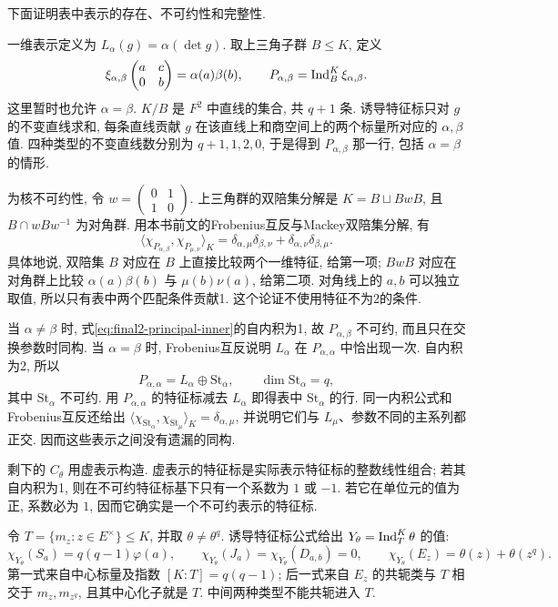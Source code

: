 \begin{solution}
下面证明表中表示的存在、不可约性和完整性.

一维表示定义为 $L_\alpha(g)=\alpha(\det g)$. 取上三角子群 $B\le K$, 定义
\[
 \xi_{\alpha,\beta}\begin{pmatrix}a&c\\0&b\end{pmatrix}=\alpha(a)\beta(b),\qquad
 P_{\alpha,\beta}=\operatorname{Ind}_B^K\xi_{\alpha,\beta}.
\]
这里暂时也允许 $\alpha=\beta$. $K/B$ 是 $F^2$ 中直线的集合, 共 $q+1$ 条. 诱导特征标只对 $g$ 的不变直线求和, 每条直线贡献 $g$ 在该直线上和商空间上的两个标量所对应的 $\alpha,\beta$ 值. 四种类型的不变直线数分别为 $q+1,1,2,0$, 于是得到 $P_{\alpha,\beta}$ 那一行, 包括 $\alpha=\beta$ 的情形.

为核不可约性, 令 $w=\left(\begin{smallmatrix}0&1\\1&0\end{smallmatrix}\right)$. 上三角群的双陪集分解是 $K=B\sqcup BwB$, 且 $B\cap wBw^{-1}$ 为对角群. 用本书前文的Frobenius互反与Mackey双陪集分解, 有
\begin{equation}\label{eq:final2-principal-inner}
 \langle\chi_{P_{\alpha,\beta}},\chi_{P_{\mu,\nu}}\rangle_K
 =\delta_{\alpha,\mu}\delta_{\beta,\nu}
  +\delta_{\alpha,\nu}\delta_{\beta,\mu}.
\end{equation}
具体地说, 双陪集 $B$ 对应在 $B$ 上直接比较两个一维特征, 给第一项; $BwB$ 对应在对角群上比较 $\alpha(a)\beta(b)$ 与 $\mu(b)\nu(a)$, 给第二项. 对角线上的 $a,b$ 可以独立取值, 所以只有表中两个匹配条件贡献1. 这个论证不使用特征不为2的条件.

当 $\alpha\ne\beta$ 时, 式\eqref{eq:final2-principal-inner}的自内积为1, 故 $P_{\alpha,\beta}$ 不可约, 而且只在交换参数时同构. 当 $\alpha=\beta$ 时, Frobenius互反说明 $L_\alpha$ 在 $P_{\alpha,\alpha}$ 中恰出现一次. 自内积为2, 所以
\[
 P_{\alpha,\alpha}=L_\alpha\oplus\mathrm{St}_\alpha,
 \qquad \dim\mathrm{St}_\alpha=q,
\]
其中 $\mathrm{St}_\alpha$ 不可约. 用 $P_{\alpha,\alpha}$ 的特征标减去 $L_\alpha$ 即得表中 $\mathrm{St}_\alpha$ 的行. 同一内积公式和Frobenius互反还给出
$\langle\chi_{\mathrm{St}_\alpha},\chi_{\mathrm{St}_\mu}\rangle_K=\delta_{\alpha,\mu}$, 并说明它们与 $L_\mu$、参数不同的主系列都正交. 因而这些表示之间没有遗漏的同构.

剩下的 $C_\theta$ 用虚表示构造. 虚表示的特征标是实际表示特征标的整数线性组合; 若其自内积为1, 则在不可约特征标基下只有一个系数为 $1$ 或 $-1$. 若它在单位元的值为正, 系数必为 $1$, 因而它确实是一个不可约表示的特征标.

令 $T=\{m_z:z\in E^\times\}\le K$, 并取 $\theta\ne\theta^q$. 诱导特征标公式给出 $Y_\theta=\operatorname{Ind}_T^K\theta$ 的值:
\[
 \chi_{Y_\theta}(S_a)=q(q-1)\varphi(a),\qquad
 \chi_{Y_\theta}(J_a)=\chi_{Y_\theta}(D_{a,b})=0,\qquad
 \chi_{Y_\theta}(E_z)=\theta(z)+\theta(z^q).
\]
第一式来自中心标量及指数 $[K:T]=q(q-1)$; 后一式来自 $E_z$ 的共轭类与 $T$ 相交于 $m_z,m_{z^q}$, 且其中心化子就是 $T$. 中间两种类型不能共轭进入 $T$.


\end{solution}
